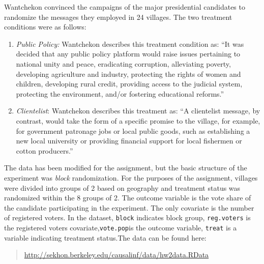 \documentclass{article}
\begin{document}
\begin{itemize}
Wantchekon convinced the campaigns of the major presidential
candidates to randomize the messages they employed in 24 villages. The
two treatment conditions were as follows:
\begin{enumerate}
\item \textit{Public Policy:} Wantchekon describes this treatment condition as: ``It was decided that any public policy platform would raise issues pertaining to national unity and peace, eradicating corruption, alleviating poverty, developing agriculture and industry, protecting the rights of women and children, developing rural credit, providing access to the judicial system, protecting the environment, and/or fostering educational reforms.''
\item \textit{Clientelist}: Wantchekon describes this treatment as: ``A clientelist message, by contrast, would take the form of a specific promise to the village, for example, for government patronage jobs or local public goods, such as establishing a new local university or providing financial support for local fishermen or cotton producers.''
\end{enumerate}

The data has been modified for the assignment, but the basic structure
of the experiment was \textit{block} randomization. For the purposes
of the assignment, villages were divided into groups of 2 based on
geography and treatment status was randomized within the 8 groups of
2. The outcome variable is the vote share of the candidate
participating in the experiment. The only covariate is the number of
registered voters. In the dataset, \texttt{block} indicates block
group, \texttt{reg.voters} is the registered voters
covariate,\texttt{vote.pop}is the outcome variable, \texttt{treat} is
a variable indicating treatment status.The data can be found here: 
\begin{quote}
  \url{http://sekhon.berkeley.edu/causalinf/data/hw2data.RData} \\
\end{quote} 



\end{itemize}
\end{document}
